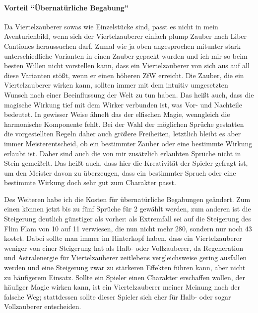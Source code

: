 \paragraph{Vorteil \enquote{Übernatürliche Begabung}}
Da Viertelzauberer sowas wie Einzelstücke sind, passt es nicht in mein Aventurienbild, wenn sich der Viertelzauberer einfach plump Zauber nach Liber Cantiones heraussuchen darf. Zumal wie ja oben angesprochen mitunter stark unterschiedliche Varianten in einen Zauber gepackt wurden und ich mir so beim besten Willen nicht vorstellen kann, dass ein Viertelzauberer von sich aus auf all diese Varianten stößt, wenn er einen höheren ZfW erreicht. Die Zauber, die ein Viertelzauberer wirken kann, sollten immer mit dem intuitiv umgesetzten Wunsch nach einer Beeinflussung der Welt zu tun haben. Das heißt auch, dass die magische Wirkung tief mit dem Wirker verbunden ist, was Vor- und Nachteile bedeutet. In gewisser Weise ähnelt das der elfischen Magie, wenngleich die harmonische Komponente fehlt. Bei der Wahl der möglichen Sprüche gestatten die vorgestellten Regeln daher auch größere Freiheiten, letztlich bleibt es aber immer Meisterentscheid, ob ein bestimmter Zauber oder eine bestimmte Wirkung erlaubt ist. Daher sind auch die von mir zusätzlich erlaubten Sprüche nicht in Stein gemeißelt. Das heißt auch, dass hier die Kreativität der Spieler gefragt ist, um den Meister davon zu überzeugen, dass ein bestimmter Spruch oder eine bestimmte Wirkung doch sehr gut zum Charakter passt.

Des Weiteren habe ich die Kosten für übernatürliche Begabungen geändert. Zum einen können jetzt bis zu fünf Sprüche für \SI{2}{\GP} gewählt werden, zum anderen ist die Steigerung deutlich günstiger als vorher: als Extremfall sei auf die Steigerung des Flim Flam von 10 auf 11 verwiesen, die nun nicht mehr \SI{280}{\AP}, sondern nur noch \SI{43}{\AP} kostet. Dabei sollte man immer im Hinterkopf haben, dass ein Viertelzauberer weniger von einer Steigerung hat als Halb- oder Vollzauberer, da Regeneration und Astralenergie für Viertelzauberer zeitlebens vergleichsweise gering ausfallen werden und eine Steigerung zwar zu stärkeren Effekten führen kann, aber nicht zu häufigerem Einsatz. Sollte ein Spieler einen Charakter erschaffen wollen, der häufiger Magie wirken kann, ist ein Viertelzauberer meiner Meinung nach der falsche Weg; stattdessen sollte dieser Spieler sich eher für Halb- oder sogar Vollzauberer entscheiden.


